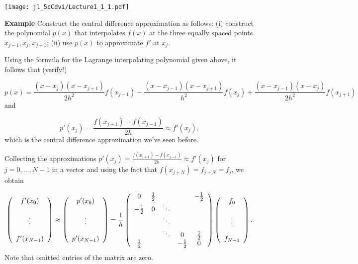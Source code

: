 \documentclass[12pt,a4paper]{article}
\begin{document}
\texttt{[image: jl\_5cCdvi/Lecture1\_1\_1.pdf]}

\textbf{Example} Construct the central difference approximation as follows: (i) construct the polynomial $p(x)$ that interpolates $f(x)$  at the three equally spaced points $x_{j-1}, x_j, x_{j+1}$; (ii) use $p(x)$ to approximate  $f'$ at $x_j$.

Using the formula for the Lagrange interpolating polynomial given above, it follows that (verify!)

\[
p(x) = \frac{(x-x_{j})(x-x_{j+1})}{2h^2}f(x_{j-1}) - \frac{(x-x_{j-1})(x-x_{j+1})}{h^2}f(x_{j}) + \frac{(x-x_{j-1})(x-x_{j})}{2h^2}f(x_{j+1})
\]
and

\[
p'(x_j) = \frac{f(x_{j+1}) - f(x_{j-1})}{2h}  \approx f'(x_j),
\]
which is the central difference approximation we've seen before.

Collecting the approximations $p'(x_j) = \frac{f(x_{j+1}) - f(x_{j-1})}{2h}  \approx f'(x_j)$ for $j = 0, \ldots, N-1$ in a vector and using the fact that $f(x_{j+N}) = f_{j+N} = f_j$, we obtain

\[
\left(
\begin{array}{c c c c c}
f'(x_0) \\
  \\
\vdots  \\
  \\
f'(x_{N-1})
\end{array}
\right) \approx 
\left(
\begin{array}{c c c c c}
p'(x_0) \\
  \\
\vdots  \\
  \\
p'(x_{N-1})
\end{array}
\right) = \frac{1}{h}
\left(
\begin{array}{c c c c c}
0 & \frac{1}{2} &   &   &  -\frac{1}{2} \\
-\frac{1}{2} & 0 & \ddots &  &  \\
   &   & \ddots &  &   \\
   &   & \ddots & 0 &  \frac{1}{2} \\
 \frac{1}{2}  &   &   & -\frac{1}{2} & 0
\end{array}
\right)
\left(
\begin{array}{c c c c c}
f_0 \\
  \\
\vdots  \\
  \\
f_{N-1}
\end{array}
\right).
\]
Note that omitted entries of the matrix are zero.
\end{document}
